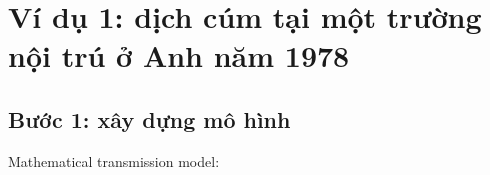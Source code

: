 \documentclass[
]{book}
\begin{document}
\hypertarget{vuxed-dux1ee5-1-dux1ecbch-cuxfam-tux1ea1i-mux1ed9t-trux1b0ux1eddng-nux1ed9i-truxfa-ux1edf-anh-nux103m-1978}{%
\section{Ví dụ 1: dịch cúm tại một trường nội trú ở Anh năm 1978}\label{vuxed-dux1ee5-1-dux1ecbch-cuxfam-tux1ea1i-mux1ed9t-trux1b0ux1eddng-nux1ed9i-truxfa-ux1edf-anh-nux103m-1978}}

\hypertarget{bux1b0ux1edbc-1-xuxe2y-dux1ef1ng-muxf4-huxecnh}{%
\subsection{Bước 1: xây dựng mô hình}\label{bux1b0ux1edbc-1-xuxe2y-dux1ef1ng-muxf4-huxecnh}}

Mathematical transmission model:
\end{document}

